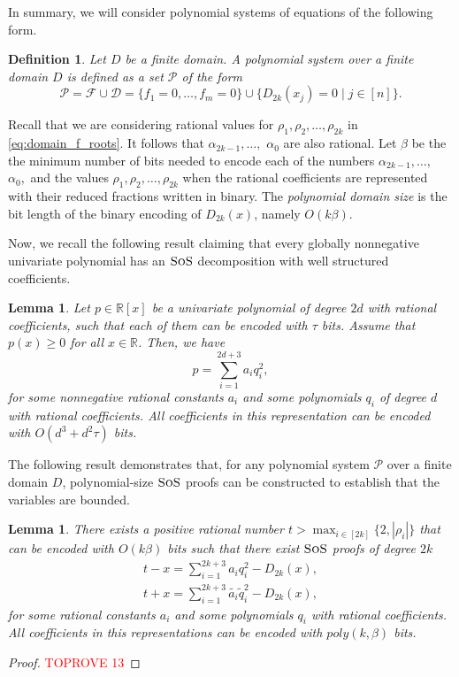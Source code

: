 \documentclass[11pt]{article}
\newcommand{\sos}{\text{\sc{SoS}}}
\newcommand{\F}{\mathcal{F}}
\newcommand{\1}{\textbf{1}}
\newcommand{\Do}{\mathcal{D}}
\newtheorem{lemma}[theorem]{Lemma}
\newtheorem{definition}[theorem]{Definition}
\begin{document}
In summary, we will consider polynomial systems of equations of the following form.

\begin{definition}
    Let $D$ be a finite domain. A \emph{polynomial system over a finite domain $D$} is defined as a set $\mathcal{P}$ of the form
    \begin{equation}\label{eq:axiomsF}
        \mathcal{P} = \F \cup \Do =\{f_1=0,\ldots,f_m=0\} \cup \{D_{2k}(x_j)=0\mid j\in[n]\}.
    \end{equation}
\end{definition}

Recall that we are considering rational values for $\rho_{1},\rho_{2},\ldots,\rho_{2k}$ in \eqref{eq:domain_f_roots}. It follows that $\alpha_{2k-1}, \ldots,$ $\alpha_0$ are also rational. Let $\beta$ be the the minimum number of bits needed to encode each of the numbers $\alpha_{2k-1}, \ldots,$ $\alpha_0,$  and the values $\rho_1, \rho_2, \dots, \rho_{2k}$ when the rational coefficients are represented with their reduced fractions written in binary.
The \emph{polynomial domain size} is the bit length of the binary encoding of $D_{2k}(x)$, namely $O(k\beta)$. 



Now, we recall the following result claiming that every globally nonnegative univariate polynomial has an $\sos$ decomposition with well structured coefficients.

\begin{lemma}\label{lemma-rational-sq}\cite[Section 4, Thm 23]{magron-schwei}
    Let $p\in \mathbb{R}[x]$ be a univariate polynomial of degree $2d$ with rational coefficients, such that each of them can be encoded with $\tau$ bits. Assume that $p(x)\geq 0$ for all $x\in \mathbb{R}$. Then, we have 
    $$p=\sum_{i=1}^{2d+3}a_iq_i^2,$$
    for some nonnegative rational constants $a_i$ and some polynomials $q_i$ of degree $d$ with rational coefficients. All coefficients in this representation can be encoded with ${O}(d^3 +d^2\tau)$ bits.
\end{lemma}
The following result demonstrates that, for any polynomial system \(\mathcal{P}\) over a finite domain \(D\), polynomial-size \(\sos\) proofs can be constructed to establish that the variables are bounded.
\begin{lemma}\label{lemma-new-t}
    There exists a positive rational number $t>\max_{i\in [2k]}\{2,|\rho_i|\}$ that can be encoded with ${O}(k\beta)$ bits such that there exist $\sos$ proofs of degree $2k$
    \begin{align}
        t-x = \sum_{i=1}^{2k+3}a_iq_i^2 - D_{2k}(x), \\
        t+x = \sum_{i=1}^{2k+3}\tilde{a_i}\tilde{q}_i^2 - D_{2k}(x),
    \end{align}
 for some rational constants $a_i$ and some polynomials $q_i$ with rational coefficients. All coefficients in this representations can be encoded with $poly(k,\beta)$ bits.
\end{lemma}
\begin{proof}\textcolor{red}{TOPROVE 13}\end{proof}
\end{document}
